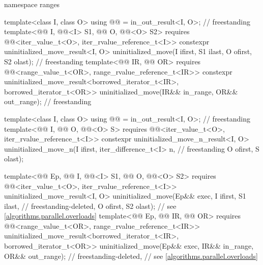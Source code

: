 \begin{codeblock}
{  namespace ranges {
    template<class I, class O>
      using @@ = in_out_result<I, O>;                        // freestanding
    template<@@ I, @@<I> S1,
             @@ O, @@<O> S2>
      requires @@<iter_value_t<O>, iter_rvalue_reference_t<I>>
        constexpr uninitialized_move_result<I, O>
          uninitialized_move(I ifirst, S1 ilast, O ofirst, S2 olast);               // freestanding
    template<@@ IR, @@ OR>
      requires @@<range_value_t<OR>, range_rvalue_reference_t<IR>>
        constexpr uninitialized_move_result<borrowed_iterator_t<IR>, borrowed_iterator_t<OR>>
          uninitialized_move(IR&& in_range, OR&& out_range);                        // freestanding

    template<class I, class O>
      using @@ = in_out_result<I, O>;                      // freestanding
    template<@@ I,
             @@ O, @@<O> S>
      requires @@<iter_value_t<O>, iter_rvalue_reference_t<I>>
        constexpr uninitialized_move_n_result<I, O>
          uninitialized_move_n(I ifirst, iter_difference_t<I> n,                    // freestanding
                               O ofirst, S olast);

    template<@@ Ep, @@ I, @@<I> S1,
             @@ O, @@<O> S2>
      requires @@<iter_value_t<O>, iter_rvalue_reference_t<I>>
        uninitialized_move_result<I, O>
          uninitialized_move(Ep&& exec, I ifirst, S1 ilast,                 // freestanding-deleted,
                             O ofirst, S2 olast);                           // see \ref{algorithms.parallel.overloads}
    template<@@ Ep, @@ IR,
             @@ OR>
      requires @@<range_value_t<OR>, range_rvalue_reference_t<IR>>
        uninitialized_move_result<borrowed_iterator_t<IR>, borrowed_iterator_t<OR>>
          uninitialized_move(Ep&& exec, IR&& in_range, OR&& out_range);     // freestanding-deleted,
                                                                            // see \ref{algorithms.parallel.overloads}

}}
\end{codeblock}

